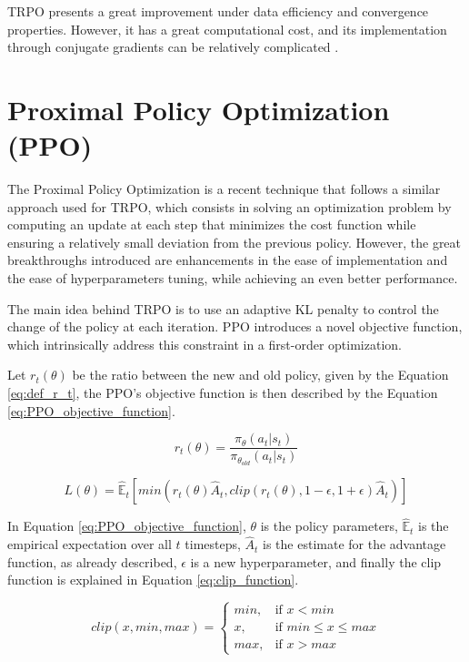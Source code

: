 TRPO presents a great improvement under data efficiency and convergence properties. However, it has a great computational cost, and its implementation through conjugate gradients can be relatively complicated \cite{PPO}.

\section{Proximal Policy Optimization (PPO)}

The Proximal Policy Optimization \cite{PPO} is a recent technique that follows a similar approach used for TRPO, which consists in solving an optimization problem by computing an update at each step that minimizes the cost function while ensuring a relatively small deviation from the previous policy. However, the great breakthroughs introduced are enhancements in the ease of implementation and the ease of hyperparameters tuning, while achieving an even better performance.

The main idea behind TRPO is to use an adaptive KL penalty to control the change of the policy at each iteration. PPO introduces a novel objective function, which intrinsically address this constraint in a first-order optimization.

Let $r_t(\theta)$ be the ratio between the new and old policy, given by the Equation \eqref{eq:def_r_t}, the PPO's objective function is then described by the Equation \eqref{eq:PPO_objective_function}.

\begin{equation}
r_t(\theta) = \frac{\pi_{\theta}(a_t|s_t)}{\pi_{\theta_{old}}(a_t|s_t)}
\label{eq:def_r_t}
\end{equation}

\begin{equation}
L(\theta) = \mathbb{\hat{E}}_t \left[ min(r_t(\theta)\hat{A}_t, clip(r_t(\theta),1-\epsilon,1+\epsilon)\hat{A}_t) \right]
\label{eq:PPO_objective_function}
\end{equation}

In Equation \eqref{eq:PPO_objective_function}, $\theta$ is the policy parameters, $\mathbb{\hat{E}}_t$ is the empirical expectation over all $t$ timesteps, $\hat{A}_t$ is the estimate for the advantage function, as already described, $\epsilon$ is a new hyperparameter, and finally the clip function is explained in Equation \eqref{eq:clip_function}.

\begin{equation}
clip(x,min,max) = \begin{cases}
        min, & \mbox{if } x < min \\
        x, & \mbox{if } min \leq x \leq max \\
        max, & \mbox{if } x > max
        \end{cases}
\label{eq:clip_function}
\end{equation}

